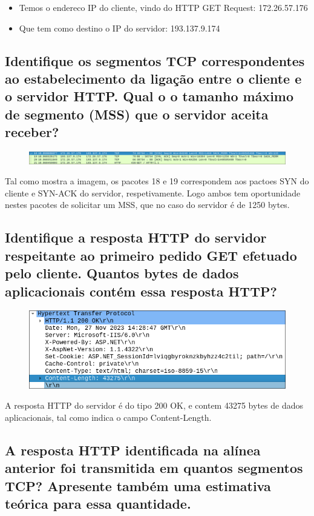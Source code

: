\documentclass{article}
\begin{document}
\begin{itemize}
    \item Temos o endereco IP do cliente, vindo do HTTP GET Request: 172.26.57.176
    \item Que tem como destino o IP do servidor: 193.137.9.174
\end{itemize}

\subsection{Identifique os segmentos TCP correspondentes ao estabelecimento da ligação entre o cliente e o servidor
HTTP. Qual o o tamanho máximo de segmento (MSS) que o servidor aceita receber?}

\begin{figure}[h]
    \centering
    \includegraphics[width=1\linewidth]{images/mss.png}
\end{figure}

Tal como mostra a imagem, os pacotes 18 e 19 correspondem aos pactoes SYN do cliente e SYN-ACK do servidor, respetivamente.
Logo ambos tem oportunidade nestes pacotes de solicitar um MSS, que no caso do servidor é de 1250 bytes.

\subsection{Identifique a resposta HTTP do servidor respeitante ao primeiro pedido GET efetuado pelo cliente.
Quantos bytes de dados aplicacionais contém essa resposta HTTP?}

\begin{figure}[h]
    \centering
    \includegraphics[width=0.5\linewidth]{images/ok.png}
\end{figure}

A resposta HTTP do servidor é do tipo 200 OK, e contem 43275 bytes de dados aplicacionais, tal como indica o campo Content-Length.

\subsection{A resposta HTTP identificada na alínea anterior foi transmitida em quantos segmentos TCP? Apresente
também uma estimativa teórica para essa quantidade.}
\end{document}
